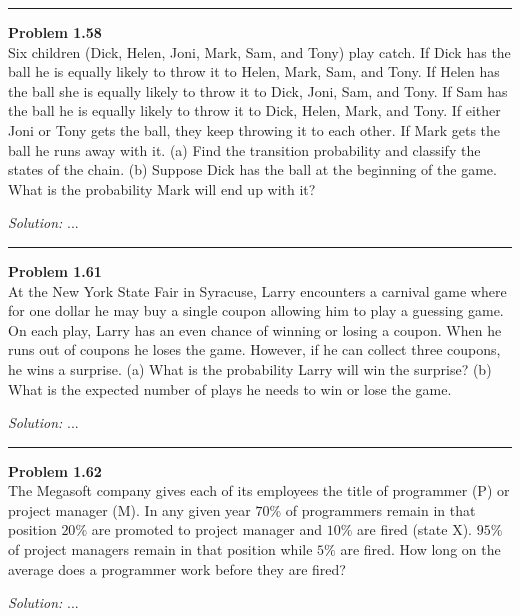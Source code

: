 \documentclass[a4paper, 11pt]{article}
\newenvironment{problem}[2][Problem]
    { \begin{mdframed}[backgroundcolor=gray!20] \textbf{#1 #2} \\}
    {  \end{mdframed}}
\newenvironment{solution}
    {\textit{Solution:}}
    {}
\begin{document}
\noindent\rule{7in}{2.8pt}

\begin{problem}{1.58}
Six children (Dick, Helen, Joni, Mark, Sam, and Tony) play catch. If Dick has the ball he is equally likely to throw it to Helen, Mark, Sam, and Tony. If Helen has the ball she is equally likely to throw it to Dick, Joni, Sam, and Tony. If Sam has the ball he is equally likely to throw it to Dick, Helen, Mark, and Tony. If either Joni or Tony gets the ball, they keep throwing it to each other. If Mark gets the ball he runs away with it. (a) Find the transition probability and classify the states of the chain. (b) Suppose Dick has the ball at the beginning of the game. What is the probability Mark will end up with it?

\end{problem}
\begin{solution}
...
\end{solution} 

\noindent\rule{7in}{2.8pt}

\begin{problem}{1.61}
At the New York State Fair in Syracuse, Larry encounters a carnival game where for one dollar he may buy a single coupon allowing him to play a guessing game. On each play, Larry has an even chance of winning or losing a coupon. When he runs out of coupons he loses the game. However, if he can collect three coupons, he wins a surprise. (a) What is the probability Larry will win the surprise? (b) What is the expected number of plays he needs to win or lose the game.
\end{problem}
\begin{solution}
...
\end{solution} 

\noindent\rule{7in}{2.8pt}

\begin{problem}{1.62}
The Megasoft company gives each of its employees the title of programmer (P) or project manager (M). In any given year $70\%$ of programmers remain in that position $20\%$ are promoted to project manager and $10\%$ are fired (state X). $95\%$ of project managers remain in that position while $5\%$ are fired. How long on the average does a programmer work before they are fired?
\end{problem}
\begin{solution}
...
\end{solution} 
\end{document}
